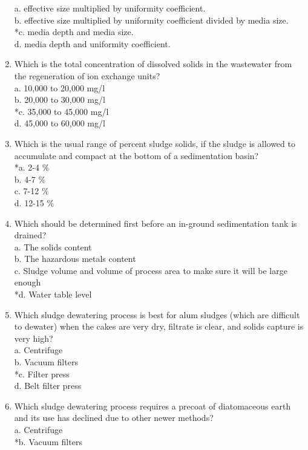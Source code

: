 \begin{enumerate}
a. effective size multiplied by uniformity coefficient.\\
b. effective size multiplied by uniformity coefficient divided by media size.\\
*c. media depth and media size.\\
d. media depth and uniformity coefficient.\\
\item Which is the total concentration of dissolved solids in the wastewater from the regeneration of ion exchange units?\\
a. 10,000 to 20,000 mg/l\\
b. 20,000 to 30,000 mg/l\\
*c. 35,000 to 45,000 mg/l\\
d. 45,000 to 60,000 mg/l\\
\item Which is the usual range of percent sludge solids, if the sludge is allowed to accumulate and compact at the bottom of a sedimentation basin?\\
*a. 2-4 \%\\
b. 4-7 \%\\
c. 7-12 \%\\
d. 12-15 \% \\
\item Which should be determined first before an in-ground sedimentation tank is drained?\\
a. The solids content\\
b. The hazardous metals content\\
c. Sludge volume and volume of process area to make sure it will be large enough\\
*d. Water table level\\
\item Which sludge dewatering process is best for alum sludges (which are difficult to dewater) when the cakes are very dry, filtrate is clear, and solids capture is very high?\\
a. Centrifuge\\
b. Vacuum filters\\
*c. Filter press\\
d. Belt filter press\\
\item Which sludge dewatering process requires a precoat of diatomaceous earth and its use has declined due to other newer methods?\\
a. Centrifuge\\
*b. Vacuum filters\\

\end{enumerate}
